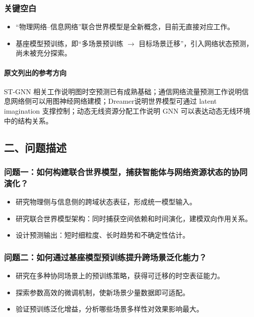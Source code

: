 ﻿\documentclass[UTF8,a4paper,11pt]{ctexart}
\begin{document}
\subsubsection{关键空白}

\begin{itemize}
  \item “物理网络--信息网络”联合世界模型是全新概念，目前无直接对应工作。
  \item 基座模型预训练，即“多场景预训练 $\rightarrow$ 目标场景迁移”，引入网络状态预测，尚未被充分探索。
\end{itemize}

\paragraph{原文列出的参考方向}
ST-GNN 相关工作\cite{sahili2025stgnn,elgendi2026stgnn}说明图时空预测已有成熟基础；通信网络流量预测工作\cite{qin2024stcomm}说明信息网络侧可以用图神经网络建模；Dreamer\cite{hafner2020dreamer}说明世界模型可通过 latent imagination 支撑控制；动态无线资源分配工作\cite{zhou2025continual}说明 GNN 可以表达动态无线环境中的结构关系。

\subsection{二、问题描述}

\subsubsection{问题一：如何构建联合世界模型，捕获智能体与网络资源状态的协同演化？}

\begin{itemize}
  \item 研究物理侧与信息侧的跨域状态表征，形成统一模型输入。
  \item 研究联合世界模型架构：同时捕获空间依赖和时间演化，建模双向作用关系。
  \item 设计预测输出：短时细粒度、长时趋势和不确定性估计。
\end{itemize}

\subsubsection{问题二：如何通过基座模型预训练提升跨场景泛化能力？}

\begin{itemize}
  \item 研究在多种协同场景上的预训练策略，获得可迁移的时空表征能力。
  \item 探索参数高效的微调机制，使新场景少量数据即可适配。
  \item 验证预训练泛化增益，分析哪些场景多样性对效果影响最大。
\end{itemize}
\end{document}
